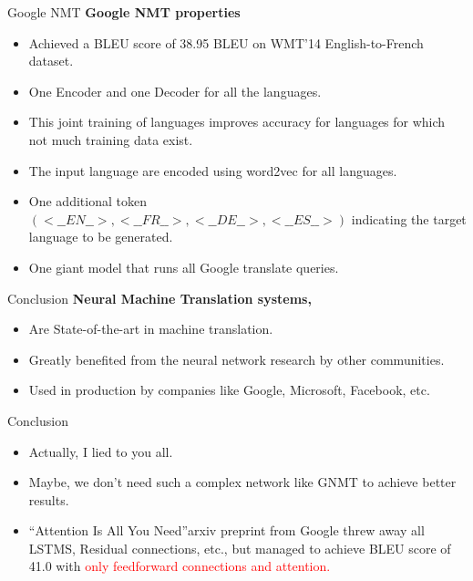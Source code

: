 ﻿\documentclass[table,aspectratio=43,mathserif,xcolor={usenames,dvipsnames,svgnames,table},10pt]{beamer}
\begin{document}
\begin{frame}{Google NMT}
\textbf{Google NMT properties}
\begin{itemize}
 \item<+-> Achieved a BLEU score of 38.95 BLEU on WMT’14 English-to-French dataset. 
 \item<+-> One Encoder and one Decoder for all the languages.
 \item<+-> This joint training of languages improves accuracy for languages for which not much training data exist.
 \item<+-> The input language are encoded using word2vec for all languages.
 \item<+-> One additional token $(<\_\_EN\_\_>, <\_\_FR\_\_>, <\_\_DE\_\_>, <\_\_ES\_\_>)$ indicating the target language to be generated.
 \item<+-> One giant model that runs all Google translate queries.
\end{itemize}
\end{frame}

\begin{frame}{Conclusion}
\textbf{Neural Machine Translation systems,}
\begin{itemize} 
 \item Are State-of-the-art in machine translation.
 \item Greatly benefited from the neural network research by other communities.
 \item Used in production by companies like Google, Microsoft, Facebook, etc.
\end{itemize}
\end{frame}

\begin{frame}{Conclusion}
 \begin{itemize}
  \item<+-> Actually, I lied to you all.
  \item<+-> Maybe, we don't need such a complex network like GNMT to achieve better results.
  \item<+-> \textquotedblleft Attention Is All You Need\textquotedblright arxiv preprint from Google threw away all LSTMS, Residual connections, etc., but managed to achieve BLEU score of 41.0 with  \textcolor{red} {only feedforward connections and attention.}
 \end{itemize}

\end{frame}
\end{document}

